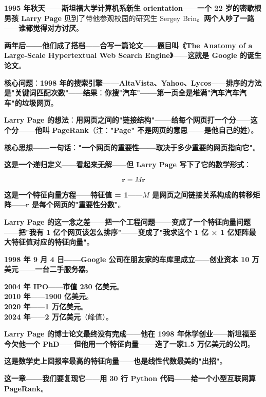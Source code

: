 \begin{tcolorbox}[storybox={\Large 小故事：Larry Page 与 1.5 万亿美元的矩阵（1998）}]
\textbf{1995 年秋天——斯坦福大学计算机系新生 orientation}——\textbf{一个 22 岁的密歇根男孩 Larry Page} 见到了带他参观校园的研究生 Sergey Brin。\textbf{两个人吵了一路}——\textbf{谁都觉得对方讨厌}。

\medskip

\textbf{两年后——他们成了搭档}——\textbf{合写一篇论文}——\textbf{题目叫《The Anatomy of a Large-Scale Hypertextual Web Search Engine》}——\textbf{这就是 Google 的诞生论文}。

\medskip

\textbf{核心问题}：\textbf{1998 年的搜索引擎——AltaVista、Yahoo、Lycos}——\textbf{排序的方法是"关键词匹配次数"}——\textbf{结果}：\textbf{你搜"汽车"——第一页全是堆满"汽车汽车汽车"的垃圾网页}。

\medskip

\textbf{Larry Page 的想法}：\textbf{用网页之间的"链接结构"——给每个网页打一个分}——\textbf{这个分——他叫 PageRank}（注：\textbf{"Page" 不是网页的意思——是他自己的姓}）。

\medskip

\textbf{核心思想——一句话}：\textbf{"一个网页的重要性——取决于多少重要的网页指向它"}。

\medskip

\textbf{这是一个递归定义}——\textbf{看起来无解}——\textbf{但 Larry Page 写下了它的数学形式}：

\[
\bm{r} = M \bm{r}
\]

\medskip

\textbf{这是一个特征向量方程}——\textbf{特征值 = 1}——\textbf{$M$ 是\textbf{网页之间链接关系构成的转移矩阵}}——\textbf{$\bm{r}$ 是\textbf{每个网页的"重要性分数"}}。

\medskip

\textbf{Larry Page 的这一念之差}——\textbf{把一个工程问题——变成了一个特征向量问题}——\textbf{把"我有 1 亿个网页该怎么排序"——变成了"我求这个 1 亿 × 1 亿矩阵最大特征值对应的特征向量"}。

\medskip

\textbf{1998 年 9 月 4 日——Google 公司在朋友家的车库里成立}——\textbf{创业资本 10 万美元——一台二手服务器}。

\medskip

\textbf{2004 年 IPO}——\textbf{市值 230 亿美元}。\\
\textbf{2010 年}——\textbf{1900 亿美元}。\\
\textbf{2020 年}——\textbf{1 万亿美元}。\\
\textbf{2024 年}——\textbf{2 万亿美元}（峰值）。

\medskip

\textbf{Larry Page 的博士论文最终没有完成}——\textbf{他在 1998 年休学创业}——\textbf{斯坦福至今欠他一个 PhD}——\textbf{但他用一个特征向量——造了一家\textbf{1.5 万亿美元的公司}}。

\medskip

\textbf{这是数学史上回报率最高的特征向量}——\textbf{也是线性代数最美的"出招"}。

\medskip

\textbf{这一章——我们要复现它}——\textbf{用 30 行 Python 代码——给一个小型互联网算 PageRank}。
\end{tcolorbox}

